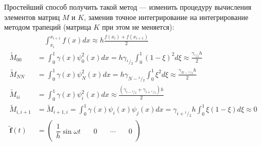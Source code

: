 \documentclass[12pt]{article}
\newcommand{\cutefrac}[2]{{}^{#1\!}\!/{\!}_#2}
\newcommand{\half}{\cutefrac{1}{2}}
\begin{document}
Простейший способ получить такой метод --- изменить процедуру вычисления
элементов матриц $M$ и $K$, заменив точное интегрирование на интегрирование
методом трапеций (матрица $K$ при этом не меняется):
\begin{align*}
&\quad\int_{x_i}^{x_{i+1}} f(x) dx \approx h\frac{f(x_i) + f(x_{i+1})}{2}\\
\widetilde{M}_{00} &= \int_0^1 \gamma(x) \psi_0^2(x) dx 
= h \gamma_{\half} \int_0^1 (1-\xi)^2 d\xi \approx
\frac{\gamma_{\half}h}{2}\\
\widetilde{M}_{NN} &= \int_0^1 \gamma(x) \psi_N^2(x) dx
= h \gamma_{N - \half} \int_0^1 \xi^2 d\xi \approx
\frac{\gamma_{N - \half}h}{2}\\
\widetilde{M}_{ii} &= \int_0^1 \gamma(x) \psi_i^2(x) dx \approx 
\frac{(\gamma_{i-\half} + \gamma_{i+\half})h}{2}\\
\widetilde{M}_{i,i+1} &= \widetilde{M}_{i+1,i} = \int_0^1 \gamma(x) \psi_i(x) \psi_j(x) dx
= \gamma_{i+\half} h \int_0^1 \xi(1-\xi) d\xi \approx 0\\
\widetilde{\mathbf{f}}(t) &= 
\begin{pmatrix}
\dfrac{1}{h} \sin \omega t & \quad 0 \quad & \cdots & \quad 0
\end{pmatrix}
\end{align*}
\end{document}
